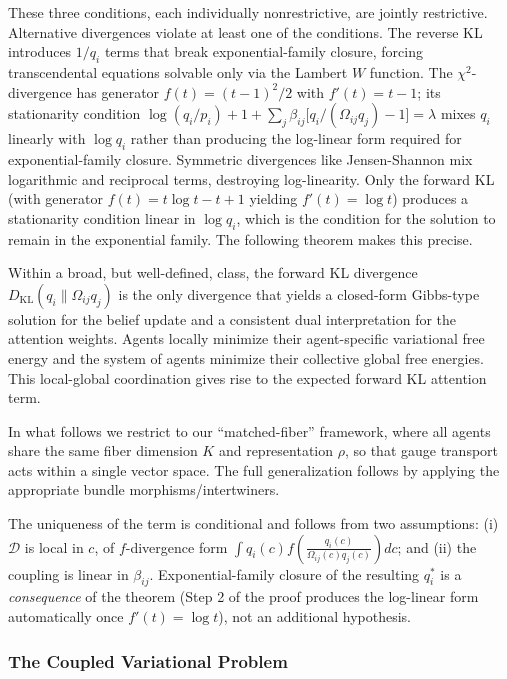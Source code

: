 \documentclass[twoside,11pt]{article}
\begin{document}
These three conditions, each individually nonrestrictive, are jointly restrictive. Alternative divergences violate at least one of the conditions. The reverse KL introduces $1/q_i$ terms that break exponential-family closure, forcing transcendental equations solvable only via the Lambert $W$ function. The $\chi^2$-divergence has generator $f(t)=(t-1)^2/2$ with $f'(t)=t-1$; its stationarity condition $\log(q_i/p_i) + 1 + \sum_j \beta_{ij}\bigl[q_i/(\Omega_{ij}q_j) - 1\bigr] = \lambda$ mixes $q_i$ linearly with $\log q_i$ rather than producing the log-linear form required for exponential-family closure. Symmetric divergences like Jensen-Shannon mix logarithmic and reciprocal terms, destroying log-linearity. Only the forward KL (with generator $f(t) = t\log t - t + 1$ yielding $f'(t) = \log t$) produces a stationarity condition linear in $\log q_i$, which is the condition for the solution to remain in the exponential family. The following theorem makes this precise.

Within a broad, but well-defined, class, the forward KL divergence $D_{\mathrm{KL}}(q_i \| \Omega_{ij} q_j)$ is the only divergence that yields a closed-form Gibbs-type solution for the belief update and a consistent dual interpretation for the attention weights. Agents locally minimize their agent-specific variational free energy and the system of agents minimize their collective global free energies. This local-global coordination gives rise to the expected forward KL attention term.

In what follows we restrict to our ``matched-fiber'' framework, where all agents share the same fiber dimension $K$ and representation $\rho$, so that gauge transport acts within a single vector space. The full generalization follows by applying the appropriate bundle morphisms/intertwiners.

The uniqueness of the term is conditional and follows from two assumptions: (i) $\mathcal{D}$ is local in $c$, of $f$-divergence form $\displaystyle \int q_i(c) f \left(\frac{q_i(c)}{\Omega_{ij}(c) q_j(c)}\right) dc$; and (ii) the coupling is linear in $\beta_{ij}$. Exponential-family closure of the resulting $q_i^*$ is a \emph{consequence} of the theorem (Step 2 of the proof produces the log-linear form automatically once $f'(t)=\log t$), not an additional hypothesis.

\subsubsection{The Coupled Variational Problem}
\end{document}
